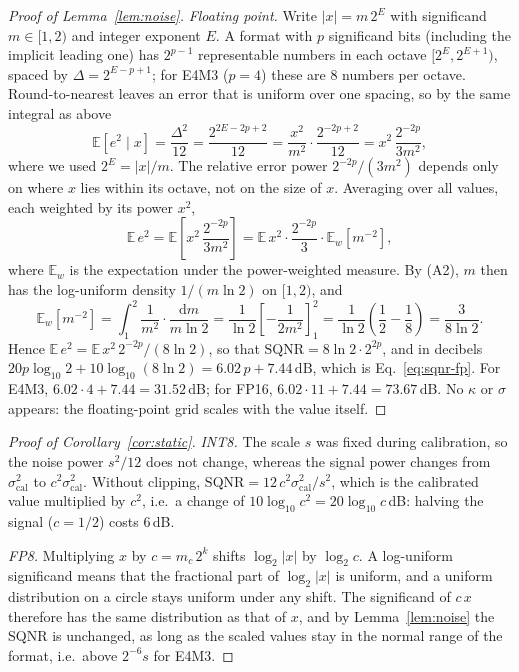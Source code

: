 \documentclass[pdflatex,sn-mathphys-num]{sn-jnl}%
\theoremstyle{thmstyleone}%
\theoremstyle{thmstyletwo}%
\theoremstyle{thmstylethree}%
\begin{document}
\begin{appendices}
\begin{proof}[Proof of Lemma~\ref{lem:noise}]
\emph{Floating point.} Write $|x|=m\,2^E$ with significand $m\in[1,2)$ and integer exponent $E$. A format with $p$ significand bits (including the implicit leading one) has $2^{p-1}$ representable numbers in each octave $[2^E,2^{E+1})$, spaced by $\Delta=2^{E-p+1}$; for E4M3 ($p=4$) these are 8 numbers per octave. Round-to-nearest leaves an error that is uniform over one spacing, so by the same integral as above
\begin{equation*}
\mathbb{E}[e^2\mid x]=\frac{\Delta^2}{12}=\frac{2^{2E-2p+2}}{12}=\frac{x^2}{m^2}\cdot\frac{2^{-2p+2}}{12}=x^2\,\frac{2^{-2p}}{3m^2},
\end{equation*}
where we used $2^E=|x|/m$. The relative error power $2^{-2p}/(3m^2)$ depends only on where $x$ lies within its octave, not on the size of $x$. Averaging over all values, each weighted by its power $x^2$,
\begin{equation*}
\mathbb{E}\,e^2=\mathbb{E}\!\left[x^2\,\frac{2^{-2p}}{3m^2}\right]=\mathbb{E}\,x^2\cdot\frac{2^{-2p}}{3}\cdot\mathbb{E}_w\!\left[m^{-2}\right],
\end{equation*}
where $\mathbb{E}_w$ is the expectation under the power-weighted measure. By (A2), $m$ then has the log-uniform density $1/(m\ln2)$ on $[1,2)$, and
\begin{equation*}
\mathbb{E}_w\!\left[m^{-2}\right]=\int_1^2\frac{1}{m^2}\cdot\frac{\mathrm{d}m}{m\ln2}=\frac{1}{\ln2}\left[-\frac{1}{2m^2}\right]_1^2=\frac{1}{\ln2}\left(\frac12-\frac18\right)=\frac{3}{8\ln2}.
\end{equation*}
Hence $\mathbb{E}\,e^2=\mathbb{E}\,x^2\,2^{-2p}/(8\ln2)$, so that $\mathrm{SQNR}=8\ln2\cdot2^{2p}$, and in decibels $20p\log_{10}2+10\log_{10}(8\ln2)=6.02\,p+7.44\,\mathrm{dB}$, which is Eq.~\eqref{eq:sqnr-fp}. For E4M3, $6.02\cdot4+7.44=31.52$\,dB; for FP16, $6.02\cdot11+7.44=73.67$\,dB. No $\kappa$ or $\sigma$ appears: the floating-point grid scales with the value itself.
\end{proof}

\begin{proof}[Proof of Corollary~\ref{cor:static}]
\emph{INT8.} The scale $s$ was fixed during calibration, so the noise power $s^2/12$ does not change, whereas the signal power changes from $\sigma_\mathrm{cal}^2$ to $c^2\sigma_\mathrm{cal}^2$. Without clipping, $\mathrm{SQNR}=12\,c^2\sigma_\mathrm{cal}^2/s^2$, which is the calibrated value multiplied by $c^2$, i.e.\ a change of $10\log_{10}c^2=20\log_{10}c$\,dB: halving the signal ($c=1/2$) costs 6\,dB.

\emph{FP8.} Multiplying $x$ by $c=m_c\,2^k$ shifts $\log_2|x|$ by $\log_2 c$. A log-uniform significand means that the fractional part of $\log_2|x|$ is uniform, and a uniform distribution on a circle stays uniform under any shift. The significand of $c\,x$ therefore has the same distribution as that of $x$, and by Lemma~\ref{lem:noise} the SQNR is unchanged, as long as the scaled values stay in the normal range of the format, i.e.\ above $2^{-6}s$ for E4M3.
\end{proof}


\end{appendices}
\end{document}
